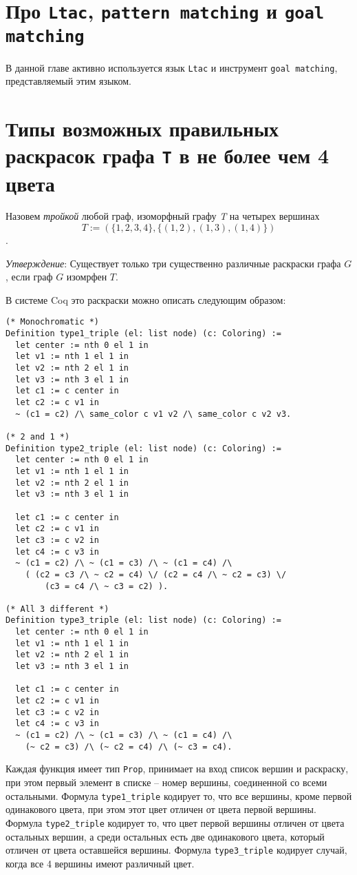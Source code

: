 \section{Про {\tt Ltac}, {\tt pattern matching} и {\tt goal matching} }
В данной главе активно используется язык {\tt Ltac} и инструмент {\tt goal matching}, представляемый этим языком.

\section{Типы возможных правильных раскрасок графа {\tt T} в не более чем 4 цвета}

Назовем {\it тройкой} любой граф, изоморфный графу {\it T} на четырех вершинах $$T := (\{1, 2, 3, 4\} , \{(1, 2), (1, 3), (1, 4) \} )$$.

{\it Утверждение}: Существует только три существенно различные раскраски графа $G$, если граф $G$ изомрфен $T$.

В системе Coq это раскраски можно описать следующим образом:

\begin{verbatim}
(* Monochromatic *)
Definition type1_triple (el: list node) (c: Coloring) :=
  let center := nth 0 el 1 in
  let v1 := nth 1 el 1 in
  let v2 := nth 2 el 1 in
  let v3 := nth 3 el 1 in
  let c1 := c center in
  let c2 := c v1 in
  ~ (c1 = c2) /\ same_color c v1 v2 /\ same_color c v2 v3.

(* 2 and 1 *)
Definition type2_triple (el: list node) (c: Coloring) :=
  let center := nth 0 el 1 in
  let v1 := nth 1 el 1 in
  let v2 := nth 2 el 1 in
  let v3 := nth 3 el 1 in

  let c1 := c center in
  let c2 := c v1 in
  let c3 := c v2 in 
  let c4 := c v3 in
  ~ (c1 = c2) /\ ~ (c1 = c3) /\ ~ (c1 = c4) /\
    ( (c2 = c3 /\ ~ c2 = c4) \/ (c2 = c4 /\ ~ c2 = c3) \/ 
        (c3 = c4 /\ ~ c3 = c2) ).

(* All 3 different *)
Definition type3_triple (el: list node) (c: Coloring) :=
  let center := nth 0 el 1 in
  let v1 := nth 1 el 1 in
  let v2 := nth 2 el 1 in
  let v3 := nth 3 el 1 in

  let c1 := c center in
  let c2 := c v1 in
  let c3 := c v2 in 
  let c4 := c v3 in
  ~ (c1 = c2) /\ ~ (c1 = c3) /\ ~ (c1 = c4) /\
    (~ c2 = c3) /\ (~ c2 = c4) /\ (~ c3 = c4).
\end{verbatim}

Каждая функция имеет тип {\tt Prop}, принимает на вход список вершин и раскраску, при этом первый элемент в списке -- номер вершины, соединенной со всеми остальными. Формула {\tt type1\_triple} кодирует то, что все вершины, кроме первой одинакового цвета, при этом этот цвет отличен от цвета первой вершины. Формула {\tt type2\_triple} кодирует то, что цвет первой вершины отличен от цвета остальных вершин, а среди остальных есть две одинакового цвета, который отличен от цвета оставшейся вершины. Формула {\tt type3\_triple} кодирует случай, когда все 4 вершины имеют различный цвет.

